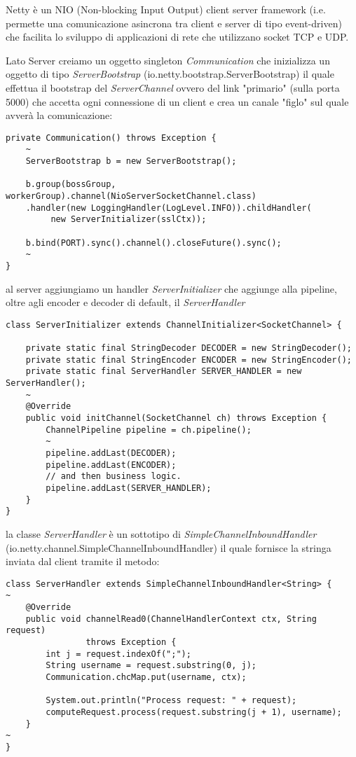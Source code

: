 
Netty è un NIO (Non-blocking Input Output) client server framework (i.e. permette una comunicazione asincrona tra client e server di tipo event-driven) che facilita lo sviluppo di applicazioni di rete che utilizzano socket TCP e UDP.

Lato Server creiamo un oggetto singleton \textit{Communication} che inizializza un oggetto di tipo \textit{ServerBootstrap} (io.netty.bootstrap.ServerBootstrap) il quale effettua il bootstrap del \textit{ServerChannel} ovvero del link "primario" (sulla porta 5000) che accetta ogni connessione di un client e crea un canale "figlo" sul quale avverà la comunicazione:
\begin{lstlisting}
private Communication() throws Exception {
	~
	ServerBootstrap b = new ServerBootstrap();

	b.group(bossGroup, workerGroup).channel(NioServerSocketChannel.class)
	.handler(new LoggingHandler(LogLevel.INFO)).childHandler(
		 new ServerInitializer(sslCtx));

	b.bind(PORT).sync().channel().closeFuture().sync();
	~
}
\end{lstlisting}
al server aggiungiamo un handler \textit{ServerInitializer} che aggiunge alla pipeline, oltre agli encoder e decoder di default, il \textit{ServerHandler}
\begin{lstlisting}
class ServerInitializer extends ChannelInitializer<SocketChannel> {

	private static final StringDecoder DECODER = new StringDecoder();
	private static final StringEncoder ENCODER = new StringEncoder();
	private static final ServerHandler SERVER_HANDLER = new ServerHandler();
	~
	@Override
	public void initChannel(SocketChannel ch) throws Exception {
		ChannelPipeline pipeline = ch.pipeline();
		~
		pipeline.addLast(DECODER);
		pipeline.addLast(ENCODER);
		// and then business logic.
		pipeline.addLast(SERVER_HANDLER);
	}
}
\end{lstlisting}
la classe \textit{ServerHandler} è un sottotipo di \textit{SimpleChannelInboundHandler} \\(io.netty.channel.SimpleChannelInboundHandler) il quale fornisce la stringa inviata dal client tramite il metodo:
\newpage
\begin{lstlisting}
class ServerHandler extends SimpleChannelInboundHandler<String> {
~
	@Override
	public void channelRead0(ChannelHandlerContext ctx, String request)
				throws Exception {
		int j = request.indexOf(";");
		String username = request.substring(0, j);
		Communication.chcMap.put(username, ctx);
		
		System.out.println("Process request: " + request);
		computeRequest.process(request.substring(j + 1), username);
	}
~
}
\end{lstlisting}
